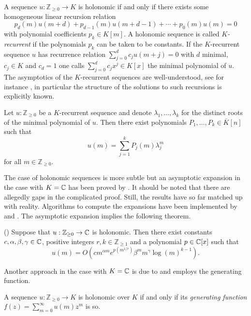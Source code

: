     A sequence $u:\mathbb{Z}_{\geq 0}\to K$ is holonomic if and only if there exists some homogeneous linear recursion relation
    $$p_d(m)u(m+d) + p_{d-1}(m)u(m+d-1) + \cdots + p_0(m)u(m) = 0 $$
    with polynomial coefficients $p_k \in K[m]$.
    A holonomic sequence is called {\it $K$-recurrent} if the polynomials $p_k$ can be taken to be constants.
    If the $K$-recurrent sequence $u$ has recurrence relation $\sum_{j=0}^d c_{j}u(m+j)= 0$ with $d$ minimal, $c_j\in K$ and $c_d = 1$ one calls $\sum_{j=0}^d c_jx^j\in K[x]$ the minimal polynomial of $u$.
    The asymptotics of the $K$-recurrent sequences are well-understood, see for instance \cite[Chapter 2]{everest2003recurrence}, in particular the structure of the solutions to such recursions is explicitly known.
    \begin{theorem}{\cite[Theorem 1.6]{nobleAsymptotics}}\label{thm: KRecurrent}
      Let $u:\mathbb{Z}_{\geq 0}$ be a $K$-recurrent sequence and denote $\lambda_1,\ldots,\lambda_k$ for the distinct roots of the minimal polynomial of $u$.
      Then there exist polynomials $P_1,\ldots,P_k \in \overline{K}[n]$ such that
      $$u(m) = \sum_{j=1}^k P_j(m)\lambda_j^m$$
      for all $m\in \mathbb{Z}_{\geq 0}$.
    \end{theorem}
    The case of holonomic sequences is more subtle but an asymptotic expansion in the case with $K = \mathbb{C}$ has been proved by \cite{birkhoff1933analytic}.
    It should be noted that there are allegedly gaps in the complicated proof.
    Still, the results have so far matched up with reality.
    Algorithms to compute the expansions have been implemented by \cite{kauers2011mathematica} and \cite{zeilberger1990holonomic}.
    The asymptotic expansion implies the following theorem.
    \begin{theorem}(\cite{birkhoff1933analytic})\label{thm: Birkhoff}
      Suppose that $u:\mathbb{Z}_{\geq 0}\to \mathbb{C}$ is holonomic.
      Then there exist constants $c,\alpha, \beta, \gamma \in \mathbb{C}$, positive integers $r,k\in \mathbb{Z}_{\geq 1}$ and a polynomial $p\in \mathbb{C}[x]$ such that
      $$u(m) = O\left(cm^{\alpha m} e^{p(m^{1/r})}\beta^m m^\gamma \log(m)^{k-1}\right).$$
    \end{theorem}
    Another approach in the case with $K = \mathbb{C}$ is due to \cite{flajolet1990singularity} and employs the generating function.
    \begin{theorem}{\cite[Theorem 1.5]{stanley1980differentiably}}\label{thm: GeneratingFunction}
      A sequence $u:\mathbb{Z}_{\geq 0}\to K$ is holonomic over $K$ if and only if its {\it generating function} $f(z) = \sum_{m=0}^{\infty} u(m)z^m$ is so.
    \end{theorem}
